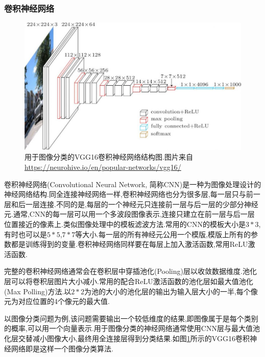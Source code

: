 \subsubsection{卷积神经网络}  \label{section:cnn}
\par
\begin{figure}[htbp!]
    \centering
    \includegraphics[width = 1.\textwidth]{chap/img/vgg16-neural-network.jpg}
    \caption{
        用于图像分类的VGG16\supercite{simonyan2014very}卷积神经网络结构图.图片来自 \url{https://neurohive.io/en/popular-networks/vgg16/}
        }\label{fig:vgg16_architecture}
\end{figure}
\par
卷积神经网络(Convolutional Neural Network, 简称CNN)是一种为图像处理设计的神经网络结构.同全连接神经网络一样,卷积神经网络也分为很多层,每一层只与前一层和后一层连接.不同的是,每层的一个神经元只连接前一层与后一层的少部分神经元.通常,CNN的每一层可以用一个多波段图像表示,连接只建立在前一层与后一层位置接近的像素上.类似图像处理中的模板滤波方法.常用的CNN的模板大小是$3*3$,有时也可以是$5*5$,$7*7$等大小.每一层的所有神经元公用一个模版,模版上所有的参数都是训练得到的变量.卷积神经网络同样要在每层上加入激活函数,常用ReLU激活函数.
\par
完整的卷积神经网络通常会在卷积层中穿插池化(Pooling)层以收敛数据维度.池化层可以将卷积层图片大小减小.常用的配合ReLU激活函数的池化层如最大值池化(Max Polling)方法.以$2*2$为池的大小的池化层的输出为输入层大小的一半,每个像元为对应位置的4个像元的最大值.
\par
以图像分类问题为例,该问题需要输出一个较低维度的结果,即图像属于是每个类别的概率,可以用一个向量表示.用于图像分类的神经网络通常使用CNN层与最大值池化层交替减小图像大小,最终用全连接层得到分类结果.如图\ref{fig:vgg16_architecture}所示的VGG16\supercite{simonyan2014very}卷积神经网络即是这样一个图像分类算法.
\par
